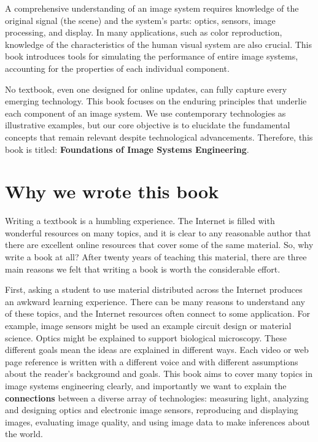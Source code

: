 \documentclass[
  letterpaper,
]{book}
\begin{document}
A comprehensive understanding of an image system requires knowledge of
the original signal (the scene) and the system's parts: optics, sensors,
image processing, and display. In many applications, such as color
reproduction, knowledge of the characteristics of the human visual
system are also crucial. This book introduces tools for simulating the
performance of entire image systems, accounting for the properties of
each individual component.

No textbook, even one designed for online updates, can fully capture
every emerging technology. This book focuses on the enduring principles
that underlie each component of an image system. We use contemporary
technologies as illustrative examples, but our core objective is to
elucidate the fundamental concepts that remain relevant despite
technological advancements. Therefore, this book is titled:
\textbf{Foundations of Image Systems Engineering}.

\section{Why we wrote this book}\label{why-we-wrote-this-book}

Writing a textbook is a humbling experience. The Internet is filled with
wonderful resources on many topics, and it is clear to any reasonable
author that there are excellent online resources that cover some of the
same material. So, why write a book at all? After twenty years of
teaching this material, there are three main reasons we felt that
writing a book is worth the considerable effort.

First, asking a student to use material distributed across the Internet
produces an awkward learning experience. There can be many reasons to
understand any of these topics, and the Internet resources often connect
to some application. For example, image sensors might be used an example
circuit design or material science. Optics might be explained to support
biological microscopy. These different goals mean the ideas are
explained in different ways. Each video or web page reference is written
with a different voice and with different assumptions about the reader's
background and goals. This book aims to cover many topics in image
systems engineering clearly, and importantly we want to explain the
\textbf{connections} between a diverse array of technologies: measuring
light, analyzing and designing optics and electronic image sensors,
reproducing and displaying images, evaluating image quality, and using
image data to make inferences about the world.
\end{document}
